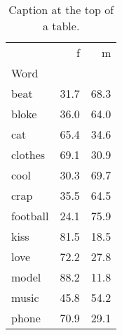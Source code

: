 \begin{table}[h]
\centering
\caption{Caption at the top of a table.}
\label{tab:pct}
\begin{tabular}{lrr}
\toprule
{} &     f &     m \\
Word     &       &       \\
\midrule
beat     &  31.7 &  68.3 \\
bloke    &  36.0 &  64.0 \\
cat      &  65.4 &  34.6 \\
clothes  &  69.1 &  30.9 \\
cool     &  30.3 &  69.7 \\
crap     &  35.5 &  64.5 \\
football &  24.1 &  75.9 \\
kiss     &  81.5 &  18.5 \\
love     &  72.2 &  27.8 \\
model    &  88.2 &  11.8 \\
music    &  45.8 &  54.2 \\
phone    &  70.9 &  29.1 \\
\bottomrule
\end{tabular}
\end{table}